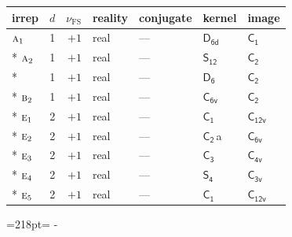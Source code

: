 \documentclass[10pt,a4paper]{article}
\newcommand{\needspace}[1]{\par\penalty-100\begingroup\dimen0=#1\relax\dimen2=\pagegoal
  \advance\dimen2-\pagetotal\ifdim\dimen0>\dimen2\relax\ifdim\dimen2>0pt\vfil\break\fi\fi
  \endgroup}
\numberwithin{equation}{section}
\newcommand{\grp}[1]{\mathsf{#1}}
\newcommand{\irr}[1]{\text{\normalfont\scshape #1}}
\newcommand{\detbox}[1]{{\setlength{\fboxsep}{1pt}\fbox{#1}}}
\newcommand{\clsletter}[1]{\,{\scriptsize\color{black!55}#1}}
\newcommand{\fsind}{\nu_{\mathrm{FS}}}
\begin{document}
{\small\renewcommand{\arraystretch}{1.25}\begin{longtable}{@{}lrrllll@{}}\toprule
irrep & $d$ & $\fsind$ & reality & conjugate & kernel & image\\\midrule\endhead
\bottomrule\endfoot\endlastfoot
$\irr{a}_{1}$ & 1 & $+1$ & real & --- & \href{D6d.pdf}{$\grp{D_{6d}}$} & \href{C1.pdf}{$\grp{C_{1}}$}\\*
$\irr{a}_{2}$ & 1 & $+1$ & real & --- & \href{S12.pdf}{$\grp{S_{12}}$} & \href{C2.pdf}{$\grp{C_{2}}$}\\*
\detbox{$\irr{b}_{1}$} & 1 & $+1$ & real & --- & \href{D6.pdf}{$\grp{D_{6}}$} & \href{C2.pdf}{$\grp{C_{2}}$}\\*
$\irr{b}_{2}$ & 1 & $+1$ & real & --- & \href{C6v.pdf}{$\grp{C_{6v}}$} & \href{C2.pdf}{$\grp{C_{2}}$}\\*
$\irr{e}_{1}$ & 2 & $+1$ & real & --- & \href{C1.pdf}{$\grp{C_{1}}$} & \href{C12v.pdf}{$\grp{C_{12v}}$}\\*
$\irr{e}_{2}$ & 2 & $+1$ & real & --- & \href{C2.pdf}{$\grp{C_{2}}$}\clsletter{a} & \href{C6v.pdf}{$\grp{C_{6v}}$}\\*
$\irr{e}_{3}$ & 2 & $+1$ & real & --- & \href{C3.pdf}{$\grp{C_{3}}$} & \href{C4v.pdf}{$\grp{C_{4v}}$}\\*
$\irr{e}_{4}$ & 2 & $+1$ & real & --- & \href{S4.pdf}{$\grp{S_{4}}$} & \href{C3v.pdf}{$\grp{C_{3v}}$}\\*
$\irr{e}_{5}$ & 2 & $+1$ & real & --- & \href{C1.pdf}{$\grp{C_{1}}$} & \href{C12v.pdf}{$\grp{C_{12v}}$}\\
\bottomrule\end{longtable}}
\needspace{218pt}
\end{document}
